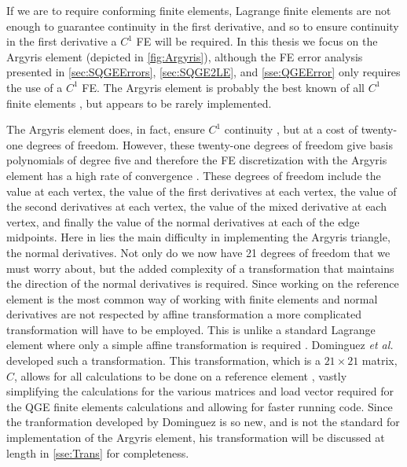 If we are to require conforming finite elements, Lagrange finite elements are
not enough to guarantee continuity in the first derivative, and so to ensure
continuity in the first derivative \cite{Johnson} a $C^1$ FE will be required.
In this thesis we focus on the Argyris element (depicted in
\autoref{fig:Argyris}), although the FE error analysis presented in
\autoref{sec:SQGEErrors}, \autoref{sec:SQGE2LE}, and \autoref{sse:QGEError} only
requires the use of a $C^1$ FE. The Argyris element is probably the best known
of all $C^1$ finite elements \cite{Argyris,Dominguez08}, but appears to be rarely
implemented.



The Argyris element does, in fact, ensure $C^1$ continuity
\cite{Dominguez08,Okabe}, but at a cost of twenty-one degrees of freedom.
However, these twenty-one degrees of freedom give basis polynomials of degree
five and therefore the FE discretization with the Argyris element has a high
rate of convergence \cite{Dominguez08}.  These degrees of freedom include the
value at each vertex, the value of the first derivatives at each vertex, the
value of the second derivatives at each vertex, the value of the mixed
derivative at each vertex, and finally the value of the normal derivatives at
each of the edge midpoints. Here in lies the main difficulty in implementing the
Argyris triangle, the normal derivatives. Not only do we now have 21 degrees of
freedom that we must worry about, but the added complexity of a transformation
that maintains the direction of the normal derivatives is required. Since
working on the reference element is the most common way of working with finite
elements and normal derivatives are not respected by affine transformation a
more complicated transformation will have to be employed. This is unlike a
standard Lagrange element where only a simple affine transformation is required
\cite{Dominguez08}.  Dominguez \emph{et al.} developed such a transformation.
This transformation, which is a $21 \times 21$ matrix, $C$, allows for all
calculations to be done on a reference element \cite{Dominguez08}, vastly
simplifying the calculations for the various matrices and load vector required
for the QGE finite elements calculations and allowing for faster running code.
Since the tranformation developed by Dominguez is so new, and is not the
standard for implementation of the Argyris element, his transformation will be
discussed at length in \autoref{sse:Trans} for completeness.
